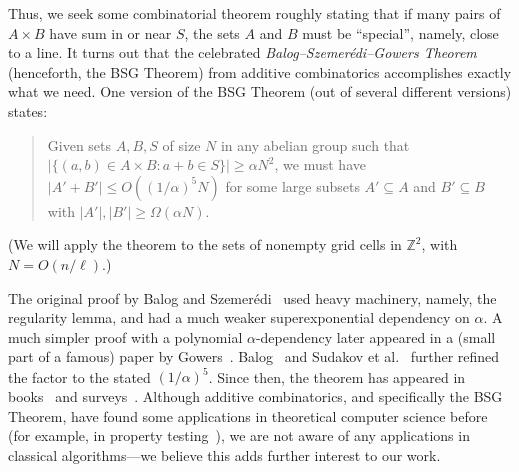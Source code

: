 \documentclass[11pt]{article}
\newcommand{\Z}{\mathbb{Z}}
\begin{document}
Thus, we seek some combinatorial theorem roughly stating that
if many pairs of $A\times B$ have sum
in or near $S$, the sets $A$ and $B$ must be ``special'', namely,
close to a line.
It turns out that
the celebrated {\em Balog--Szemer\'edi--Gowers Theorem} (henceforth,
the BSG Theorem) from additive combinatorics accomplishes exactly
what we need.
One version of
the BSG Theorem (out of several different versions) states:
\begin{quote}
Given sets $A,B,S$ of size
$N$ in any abelian group such that $|\{(a,b)\in A\times B: a+b\in S\}|\ge \alpha N^2$,
we must have $|A'+B'| \le O((1/\alpha)^5 N)$ for some
large subsets $A'\subseteq A$ and $B'\subseteq B$ with
$|A'|,|B'|\ge \Omega(\alpha N)$.
\end{quote}
(We will apply the theorem to the sets of nonempty grid cells
in $\Z^2$, with $N=O(n/\ell)$.)

The original proof by
Balog and Szemer\'edi~\cite{BS94}
used heavy machinery, namely, the regularity lemma, and
had a much weaker superexponential dependency on $\alpha$.
A much simpler proof with a polynomial $\alpha$-dependency later appeared in a (small part of a famous)
paper by Gowers~\cite{Gowers01}.  Balog~\cite{Balog07} and Sudakov
et al.~\cite{SSV94} further refined the factor to the stated $(1/\alpha)^5$.
Since then, the theorem has appeared in books~\cite{TV06} and surveys~\cite{Lovett14,Viola11}.
Although additive combinatorics, and specifically the BSG Theorem, have found some applications in theoretical computer science
before~\cite{Lovett14,Viola11} (for example, in
property testing~\cite{BLR}), we are not aware of any applications in classical algorithms---we believe this adds further interest to our work.
\end{document}
